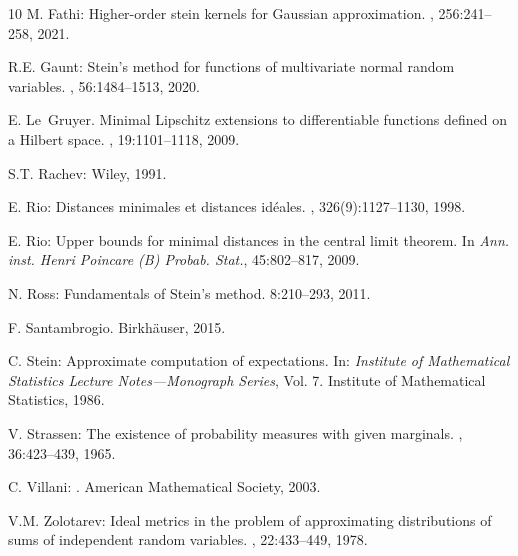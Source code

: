 \documentclass[11pt,reqno]{amsart}
\theoremstyle{definition}
\numberwithin{equation}{section}
\begin{document}
\begin{thebibliography}{10}
M. Fathi:
\newblock Higher-order stein kernels for Gaussian approximation.
, 256:241--258, 2021.

R.E. Gaunt:
\newblock Stein's method for functions of multivariate normal random variables.
, 56:1484--1513, 2020.

E. Le~Gruyer.
\newblock Minimal Lipschitz extensions to differentiable functions defined on a
Hilbert space.
, 19:1101--1118, 2009.

S.T. Rachev:
\newblock Wiley, 1991.

E. Rio:
\newblock Distances minimales et distances id\'eales.
, 326(9):1127--1130, 1998.

E. Rio:
\newblock Upper bounds for minimal distances in the central limit theorem.
\newblock In {\em Ann. inst. Henri Poincare (B) Probab. Stat.}, 45:802--817, 2009.
 
N. Ross:
\newblock Fundamentals of Stein’s method. 
 8:210--293, 2011.

F. Santambrogio.
\newblock Birkh\"{a}user, 2015.

C. Stein:
\newblock Approximate computation of expectations.
\newblock In: {\em Institute of Mathematical Statistics Lecture Notes—Monograph Series}, Vol. 7. Institute of Mathematical Statistics, 1986.
  
  
V. Strassen:
\newblock The existence of probability measures with given marginals.
, 36:423--439, 1965.

	C. Villani:
	.
	\newblock American Mathematical Society, 2003.

V.M. Zolotarev:
\newblock Ideal metrics in the problem of approximating distributions of sums
of independent random variables.
, 22:433--449,
1978.


\end{thebibliography}


\bigskip
\end{document}
